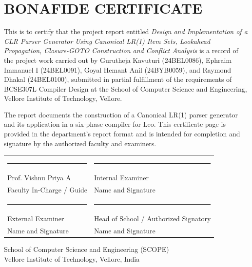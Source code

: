 \documentclass[12pt,a4paper,oneside]{report}
\newcommand{\placeholderline}{\rule{0.34\textwidth}{0.4pt}}
\begin{document}
\chapter*{BONAFIDE CERTIFICATE}
This is to certify that the project report entitled \emph{Design and Implementation of a CLR Parser Generator Using Canonical LR(1) Item Sets, Lookahead Propagation, Closure-GOTO Construction and Conflict Analysis} is a record of the project work carried out by Gurutheja Kavuturi (24BEL0086), Ephraim Immanuel I (24BEL0091), Goyal Hemant Anil (24BYB0059), and Raymond Dhakal (24BEL0100), submitted in partial fulfillment of the requirements of BCSE307L Compiler Design at the School of Computer Science and Engineering, Vellore Institute of Technology, Vellore.\par
\vspace{0.6cm}
The report documents the construction of a Canonical LR(1) parser generator and its application in a six-phase compiler for Leo. This certificate page is provided in the department's report format and is intended for completion and signature by the authorized faculty and examiners.\par
\vspace{2.3cm}
\begin{tabularx}{\textwidth}{>{\centering\arraybackslash}X >{\centering\arraybackslash}X}
\placeholderline & \placeholderline\\
Prof. Vishnu Priya A & Internal Examiner\\
Faculty In-Charge / Guide & Name and Signature\\[1.7cm]
\placeholderline & \placeholderline\\
External Examiner & Head of School / Authorized Signatory\\
Name and Signature & Name and Signature\\
\end{tabularx}
\vfill
School of Computer Science and Engineering (SCOPE)\\
Vellore Institute of Technology, Vellore, India
\clearpage
\end{document}
